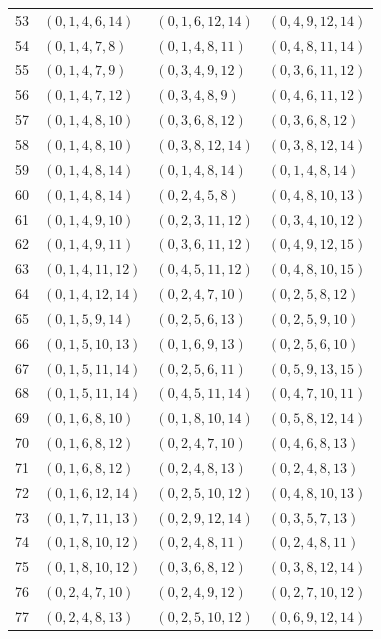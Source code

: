 \begin{longtable}{rlll}
53 & $(0,1,4,6,14)$ & $(0,1,6,12,14)$ & $(0,4,9,12,14)$ \\
54 & $(0,1,4,7,8)$ & $(0,1,4,8,11)$ & $(0,4,8,11,14)$ \\
55 & $(0,1,4,7,9)$ & $(0,3,4,9,12)$ & $(0,3,6,11,12)$ \\
56 & $(0,1,4,7,12)$ & $(0,3,4,8,9)$ & $(0,4,6,11,12)$ \\
57 & $(0,1,4,8,10)$ & $(0,3,6,8,12)$ & $(0,3,6,8,12)$ \\
58 & $(0,1,4,8,10)$ & $(0,3,8,12,14)$ & $(0,3,8,12,14)$ \\
59 & $(0,1,4,8,14)$ & $(0,1,4,8,14)$ & $(0,1,4,8,14)$ \\
60 & $(0,1,4,8,14)$ & $(0,2,4,5,8)$ & $(0,4,8,10,13)$ \\
61 & $(0,1,4,9,10)$ & $(0,2,3,11,12)$ & $(0,3,4,10,12)$ \\
62 & $(0,1,4,9,11)$ & $(0,3,6,11,12)$ & $(0,4,9,12,15)$ \\
63 & $(0,1,4,11,12)$ & $(0,4,5,11,12)$ & $(0,4,8,10,15)$ \\
64 & $(0,1,4,12,14)$ & $(0,2,4,7,10)$ & $(0,2,5,8,12)$ \\
65 & $(0,1,5,9,14)$ & $(0,2,5,6,13)$ & $(0,2,5,9,10)$ \\
66 & $(0,1,5,10,13)$ & $(0,1,6,9,13)$ & $(0,2,5,6,10)$ \\
67 & $(0,1,5,11,14)$ & $(0,2,5,6,11)$ & $(0,5,9,13,15)$ \\
68 & $(0,1,5,11,14)$ & $(0,4,5,11,14)$ & $(0,4,7,10,11)$ \\
69 & $(0,1,6,8,10)$ & $(0,1,8,10,14)$ & $(0,5,8,12,14)$ \\
70 & $(0,1,6,8,12)$ & $(0,2,4,7,10)$ & $(0,4,6,8,13)$ \\
71 & $(0,1,6,8,12)$ & $(0,2,4,8,13)$ & $(0,2,4,8,13)$ \\
72 & $(0,1,6,12,14)$ & $(0,2,5,10,12)$ & $(0,4,8,10,13)$ \\
73 & $(0,1,7,11,13)$ & $(0,2,9,12,14)$ & $(0,3,5,7,13)$ \\
74 & $(0,1,8,10,12)$ & $(0,2,4,8,11)$ & $(0,2,4,8,11)$ \\
75 & $(0,1,8,10,12)$ & $(0,3,6,8,12)$ & $(0,3,8,12,14)$ \\
76 & $(0,2,4,7,10)$ & $(0,2,4,9,12)$ & $(0,2,7,10,12)$ \\
77 & $(0,2,4,8,13)$ & $(0,2,5,10,12)$ & $(0,6,9,12,14)$ \\
\hline
\end{longtable}
